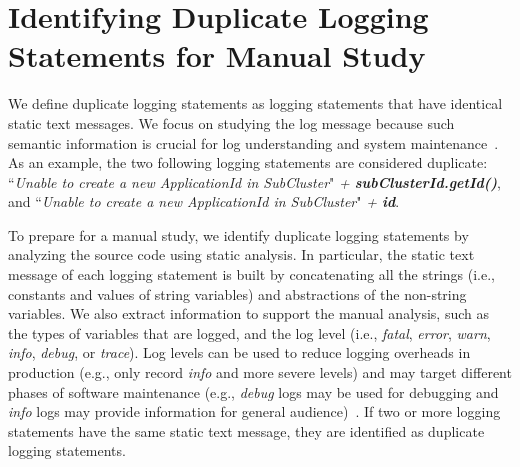\section{Identifying Duplicate Logging Statements for Manual Study}
\label{sec:prestudy}

We define duplicate logging statements as logging statements that have identical static text messages. We focus on studying the log message because such semantic information is crucial for log understanding and system maintenance~\cite{Shang:2014:ULL:2705615.2706065, Yuan:2012:CLP:2337223.2337236}. As an example, the two following logging statements are considered duplicate: ``{\em Unable to create a new ApplicationId in SubCluster}" {\em + \textbf{ subClusterId.getId()}}, and ``{\em Unable to create a new ApplicationId in SubCluster}" {\em + \textbf{ id}}.



To prepare for a manual study, we identify duplicate logging statements by analyzing the source code using static analysis. In particular, the static text message of each logging statement is built by concatenating all the strings (i.e., constants and values of string variables) and abstractions of the non-string variables.
We also extract information to support the manual analysis, such as the types of variables that are logged, and the log level (i.e., {\em fatal}, {\em error}, {\em warn}, {\em info}, {\em debug}, or {\em trace}). Log levels can be used to reduce logging overheads in production (e.g., only record {\em info} and more severe levels) and may target different phases of software maintenance (e.g., {\em debug} logs may be used for debugging and {\em info} logs may provide information for general audience)~\cite{Li2017, Yuan:2012:CLP:2337223.2337236}. If two or more logging statements have the same static text message, they are identified as duplicate logging statements. 

